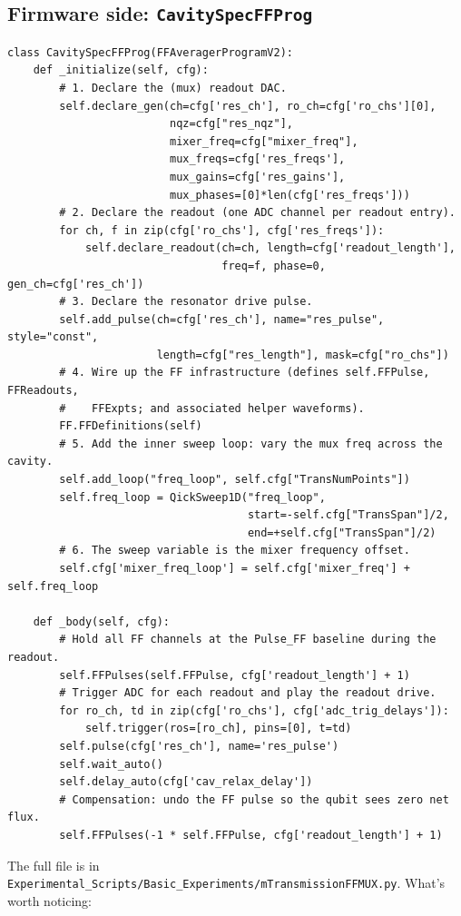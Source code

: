 \documentclass[11pt,letterpaper]{article}
\begin{document}
\subsection{Firmware side: \texttt{CavitySpecFFProg}}
\begin{lstlisting}
class CavitySpecFFProg(FFAveragerProgramV2):
    def _initialize(self, cfg):
        # 1. Declare the (mux) readout DAC.
        self.declare_gen(ch=cfg['res_ch'], ro_ch=cfg['ro_chs'][0],
                         nqz=cfg["res_nqz"],
                         mixer_freq=cfg["mixer_freq"],
                         mux_freqs=cfg['res_freqs'],
                         mux_gains=cfg['res_gains'],
                         mux_phases=[0]*len(cfg['res_freqs']))
        # 2. Declare the readout (one ADC channel per readout entry).
        for ch, f in zip(cfg['ro_chs'], cfg['res_freqs']):
            self.declare_readout(ch=ch, length=cfg['readout_length'],
                                 freq=f, phase=0, gen_ch=cfg['res_ch'])
        # 3. Declare the resonator drive pulse.
        self.add_pulse(ch=cfg['res_ch'], name="res_pulse", style="const",
                       length=cfg["res_length"], mask=cfg["ro_chs"])
        # 4. Wire up the FF infrastructure (defines self.FFPulse, FFReadouts,
        #    FFExpts; and associated helper waveforms).
        FF.FFDefinitions(self)
        # 5. Add the inner sweep loop: vary the mux freq across the cavity.
        self.add_loop("freq_loop", self.cfg["TransNumPoints"])
        self.freq_loop = QickSweep1D("freq_loop",
                                     start=-self.cfg["TransSpan"]/2,
                                     end=+self.cfg["TransSpan"]/2)
        # 6. The sweep variable is the mixer frequency offset.
        self.cfg['mixer_freq_loop'] = self.cfg['mixer_freq'] + self.freq_loop

    def _body(self, cfg):
        # Hold all FF channels at the Pulse_FF baseline during the readout.
        self.FFPulses(self.FFPulse, cfg['readout_length'] + 1)
        # Trigger ADC for each readout and play the readout drive.
        for ro_ch, td in zip(cfg['ro_chs'], cfg['adc_trig_delays']):
            self.trigger(ros=[ro_ch], pins=[0], t=td)
        self.pulse(cfg['res_ch'], name='res_pulse')
        self.wait_auto()
        self.delay_auto(cfg['cav_relax_delay'])
        # Compensation: undo the FF pulse so the qubit sees zero net flux.
        self.FFPulses(-1 * self.FFPulse, cfg['readout_length'] + 1)
\end{lstlisting}
The full file is in \texttt{Experimental\_Scripts/Basic\_Experiments/mTransmissionFFMUX.py}. What's worth noticing:
\end{document}
